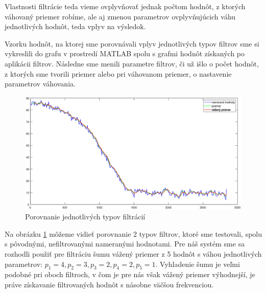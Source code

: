 Vlastnosti filtrácie teda vieme ovplyvňovať jednak počtom hodnôt, z ktorých váhovaný priemer robíme, ale aj zmenou parametrov ovplyvňujúcich váhu jednotlivých hodnôt, teda vplyv na výsledok.

Vzorku hodnôt, na ktorej sme porovnávali vplyv jednotlivých typov filtrov sme si vykreslili do grafu v prostredí MATLAB spolu s grafmi hodnôt získaných po aplikácii filtrov. Následne sme menili parametre filtrov, či už išlo o počet hodnôt, z ktorých sme tvorili priemer alebo pri váhovanom priemer, o nastavenie parametrov váhovania.

\begin{figure}[!h]
	\centering
	\includegraphics[width=140mm]{obr/Filtracia.eps}
	\caption{Porovnanie jednotlivých typov filtrácií }\label{OBRAZOK 3.3.1} 
\end{figure} 

Na obrázku \ref{OBRAZOK 3.3.1} môžeme vidieť porovnanie 2 typov filtrov, ktoré sme testovali, spolu s pôvodnými, nefiltrovanými nameranými hodnotami. 
Pre náš systém sme sa rozhodli použiť pre filtráciu šumu vážený priemer z 5 hodnôt s váhou jednotlivých parametrov: $p_1=4, p_2=3, p_3=2, p_4=2, p_5=1$.
Vyhladenie šumu je veľmi podobné pri oboch filtroch, v čom je pre nás však vážený priemer výhodnejší, je práve získavanie filtrovaných hodnôt s násobne väčšou frekvenciou.

